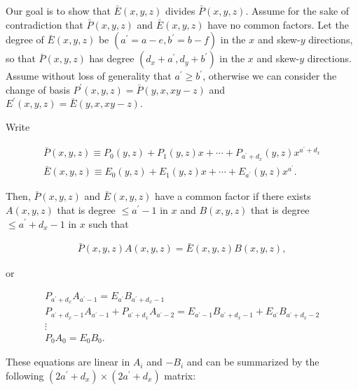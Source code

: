 \documentclass[10pt,a4paper]{article}
\begin{document}
Our goal is to show that $\bar{E}(x,y,z)$ divides $\bar{P}(x,y,z)$. Assume for the sake of contradiction that $\bar{P}(x,y,z)$ and $\bar{E}(x,y,z)$ have no common factors. Let the degree of $\bar{E}(x,y,z)$ be $(a^{\prime}=a-e,b^{\prime}=b-f)$ in the $x$ and skew-$y$ directions, so that $\bar{P}(x,y,z)$ has degree $(d_{x}+a^{\prime},d_{y}+b^{\prime})$ in the $x$ and skew-$y$ directions.
Assume without loss of generality that $a^{\prime}\geq b^{\prime}$, otherwise we can consider the change of basis $P^{\prime}(x,y,z)=\bar{P}(y,x,xy-z)$ and $E^{\prime}(x,y,z)=\bar{E}(y,x,xy-z)$.\par




Write\par


\[\begin{gathered}
\displaystyle\bar{P}(x,y,z) \displaystyle\equiv P_{0}(y,z)+P_{1}(y,z)x+\cdots+P_{a^{\prime}+d_{x}}(y,z)x^{a^{\prime}+d_{x}} \\
\displaystyle\bar{E}(x,y,z) \displaystyle\equiv E_{0}(y,z)+E_{1}(y,z)x+\cdots+E_{a^{\prime}}(y,z)x^{a^{\prime}}.
\end{gathered}\]


Then, $\bar{P}(x,y,z)$ and $\bar{E}(x,y,z)$ have a common factor if there exists $A(x,y,z)$ that is degree $\leq a^{\prime}-1$ in $x$ and $B(x,y,z)$ that is degree $\leq a^{\prime}+d_{x}-1$ in $x$ such that\par


\[\begin{gathered}
\bar{P}(x,y,z)A(x,y,z)=\bar{E}(x,y,z)B(x,y,z),
\end{gathered}\]


or\par


\[\begin{gathered}
\displaystyle P_{a^{\prime}+d_{x}}A_{a^{\prime}-1} \displaystyle=E_{a^{\prime}}B_{a^{\prime}+d_{x}-1} \\
\displaystyle P_{a^{\prime}+d_{x}-1}A_{a^{\prime}-1}+P_{a^{\prime}+d_{x}}A_{a^{\prime}-2} \displaystyle=E_{a^{\prime}-1}B_{a^{\prime}+d_{x}-1}+E_{a^{\prime}}B_{a^{\prime}+d_{x}-2} \\
\displaystyle\vdots \\
\displaystyle P_{0}A_{0} \displaystyle=E_{0}B_{0}.
\end{gathered}\]


These equations are linear in $A_{i}$ and $-B_{i}$ and can be summarized by the following $(2a^{\prime}+d_{x})\times(2a^{\prime}+d_{x})$ matrix:\par
\end{document}
